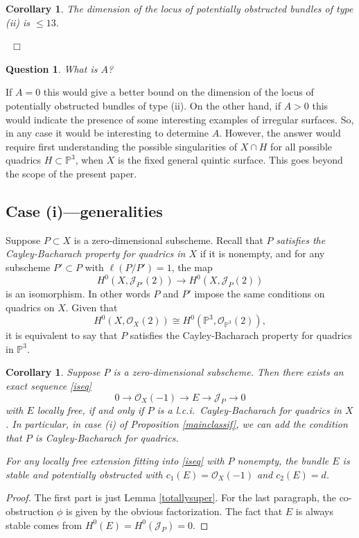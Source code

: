 \documentclass{amsart}
\theoremstyle{plain}
\newtheorem{corollary}[theorem]{Corollary}
\newtheorem{question}[theorem]{Question}
\numberwithin{equation}{section}
\begin{document}
\begin{corollary}
\label{A13}
The dimension of the locus of potentially obstructed bundles of type (ii) is $\leq 13$.
\end{corollary}
{\ \hfill $\Box$}

\begin{question}
\label{iiquest}
What is $A$?
\end{question}

If $A=0$ this would give a better bound on the dimension of 
the locus of potentially obstructed 
bundles of type (ii). On the other hand, if $A>0$ this would
indicate the presence of some interesting examples of irregular surfaces. So, in
any case it would be interesting to determine $A$. However, 
the answer would require first understanding the possible singularities
of $X\cap H$ for all possible quadrics $H\subset {{\mathbb P}} ^3$, when $X$ is the fixed
general quintic surface. This goes beyond the scope of the present paper. 

\subsection{Case (i)---generalities}

Suppose $P\subset X$ is a zero-dimensional subscheme. Recall that
$P$  {\em satisfies the Cayley-Bacharach property for quadrics in $X$} if it is nonempty, and for any subscheme $P'\subset P$ with $\ell (P/P')=1$,
the map 
$$
H^0(X,{{\mathcal J}} _{P'}(2))\rightarrow H^0(X,{{\mathcal J}} _{P}(2))
$$
is an isomorphism. In other words $P$ and $P'$ impose the same conditions
on quadrics on $X$. Given that 
$$
H^0(X,{{\mathcal O}} _X(2))\cong H^0({{\mathbb P}} ^3, {{\mathcal O}} _{{{\mathbb P}} ^3}(2)),
$$
it is equivalent to say that $P$ satisfies the Cayley-Bacharach property 
for quadrics in ${{\mathbb P}} ^3$. 

\begin{corollary}
\label{extensionexists}
Suppose $P$ is a zero-dimensional subscheme. Then there exists an exact sequence
\eqref{iseq}
$$
0\rightarrow {{\mathcal O}} _X(-1)\rightarrow E \rightarrow {{\mathcal J}} _P\rightarrow 0
$$
with $E$ locally free, if and only if $P$ is a l.c.i.\ Cayley-Bacharach for quadrics in $X$.
In particular, in case (i) of Proposition \ref{mainclassif}, we can add the condition that
$P$ is Cayley-Bacharach for quadrics. 

For any locally free extension fitting into \eqref{iseq} with $P$ nonempty,
the bundle $E$ is stable
and potentially obstructed with $c_1(E)={{\mathcal O}} _X(-1)$ and $c_2(E) = d$. 
\end{corollary}
\begin{proof}
The first part is just Lemma \ref{totallysuper}. For the last paragraph,
the co-obstruction $\phi$ is given by the obvious factorization. 
The fact that $E$ is always stable comes from $H^0(E)=H^0({{\mathcal J}} _P)=0$.
\end{proof}
\end{document}
